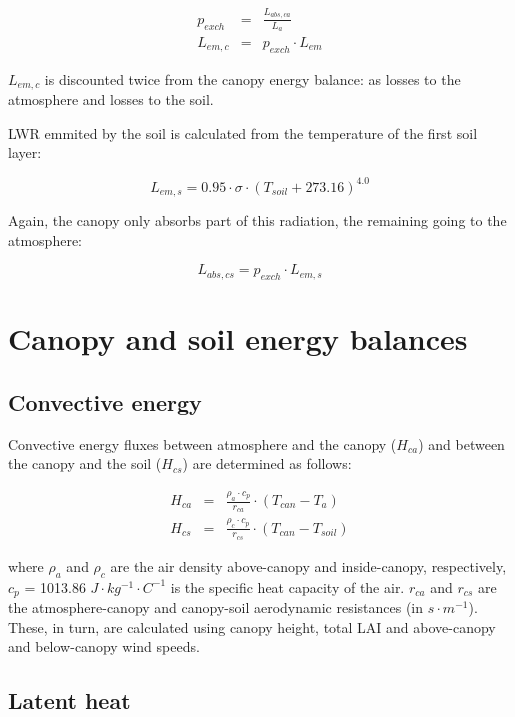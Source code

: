 \documentclass[]{book}
\begin{document}
\begin{eqnarray}
p_{exch} &=& \frac{L_{abs,ca}}{L_a} \\
L_{em, c} &=& p_{exch} \cdot L_{em}
\end{eqnarray}

\(L_{em, c}\) is discounted twice from the canopy energy balance: as
losses to the atmosphere and losses to the soil.

LWR emmited by the soil is calculated from the temperature of the first
soil layer:

\begin{equation}
L_{em, s} = 0.95 \cdot \sigma \cdot (T_{soil} + 273.16)^{4.0}
\end{equation}

Again, the canopy only absorbs part of this radiation, the remaining
going to the atmosphere:

\begin{equation}
L_{abs, cs} = p_{exch} \cdot L_{em,s}
\end{equation}

\chapter{Canopy and soil energy
balances}\label{canopy-and-soil-energy-balances}

\section{Convective energy}\label{convective-energy}

Convective energy fluxes between atmosphere and the canopy (\(H_{ca}\))
and between the canopy and the soil (\(H_{cs}\)) are determined as
follows:

\begin{eqnarray}
H_{ca} &=& \frac{\rho_{a} \cdot c_p}{r_{ca}}\cdot (T_{can} - T_a) \\
H_{cs} &=& \frac{\rho_{c} \cdot c_p}{r_{cs}}\cdot (T_{can} - T_{soil})
\end{eqnarray}

where \(\rho_{a}\) and \(\rho_{c}\) are the air density above-canopy and
inside-canopy, respectively, \(c_{p}\) = 1013.86 \(J·kg^{-1}·C^{-1}\) is
the specific heat capacity of the air. \(r_{ca}\) and \(r_{cs}\) are the
atmosphere-canopy and canopy-soil aerodynamic resistances (in
\(s·m^{-1}\)). These, in turn, are calculated using canopy height, total
LAI and above-canopy and below-canopy wind speeds.

\section{Latent heat}\label{latent-heat}
\end{document}
